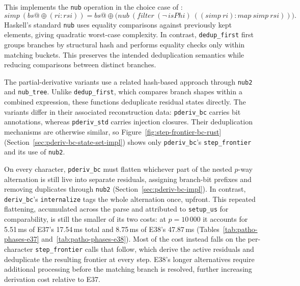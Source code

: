 This implements the \texttt{nub} operation
in the choice case of
\citet[sect.~3, Fig.~6]{sulzmannlu2014}:
\[
simp\ (bs@{\oplus}(ri : rsi)) =
bs@{\oplus}\bigl(
\mathit{nub}\
(\mathit{filter}\ (\neg\,\mathit{isPhi})\
((simp\ ri) : \mathit{map}\ simp\ rsi))
\bigr).
\]
Haskell's standard \texttt{nub} uses equality
comparisons against previously kept elements,
giving quadratic worst-case complexity.
In contrast, \texttt{dedup\_first} first groups
branches by structural hash and performs equality
checks only within matching buckets.
This preserves the intended deduplication semantics
while reducing comparisons between distinct branches.

The partial-derivative variants use a related
hash-based approach through \texttt{nub2}
and \texttt{nub\_tree}.
Unlike \texttt{dedup\_first}, which compares
branch shapes within a combined expression,
these functions deduplicate residual states directly.
The variants differ in their associated
reconstruction data: \texttt{pderiv\_bc}
carries bit annotations, whereas
\texttt{pderiv\_std} carries injection closures.
Their deduplication mechanisms are otherwise
similar, so Figure~\ref{fig:step-frontier-bc-rust}
(Section~\ref{sec:pderiv-bc-state-set-impl})
shows only \texttt{pderiv\_bc}'s
\texttt{step\_frontier} and its use of \texttt{nub2}.

On every character, \texttt{pderiv\_bc} must flatten whichever
part of the nested $p$-way alternation is still live into
separate residuals, assigning branch-bit prefixes and
removing duplicates through \texttt{nub2}
(Section~\ref{sec:pderiv-bc-impl}).
In contrast, \texttt{deriv\_bc}'s \texttt{internalize}
tags the whole alternation once, upfront.
This repeated flattening, 
accumulated across the parse and attributed to \texttt{setup\_us} for comparability, 
is still the smaller of its two costs: 
at $p=10\,000$ it accounts for 5.51\,ms of E37's 17.54\,ms total 
and 8.75\,ms of E38's 47.87\,ms
(Tables~\ref{tab:patho-phases-e37}
and~\ref{tab:patho-phases-e38}).
Most of the cost instead falls on the
per-character \texttt{step\_frontier} calls
that follow, which derive the active residuals
and deduplicate the resulting frontier at
every step.
E38's longer alternatives require additional
processing before the matching branch is resolved,
further increasing derivation cost relative to E37.

